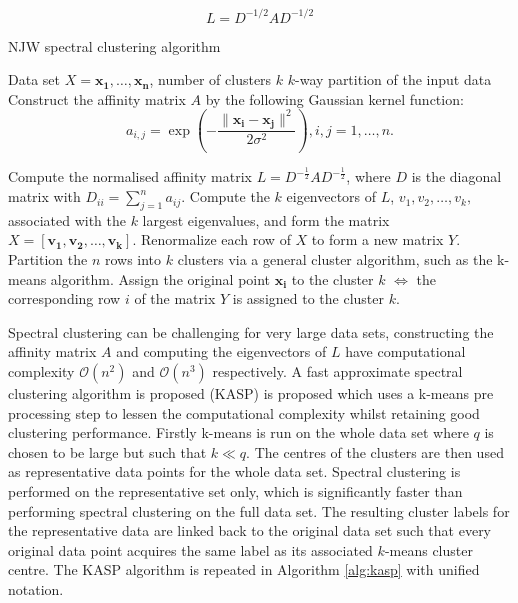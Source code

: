  \begin{equation}
   \label{eq:norm_laplacian}
   L=D^{-1/2}AD^{-1/2}
 \end{equation}


\begin{algorithm}
\caption{NJW spectral clustering algorithm}
\begin{algorithmic}[1]
\REQUIRE Data set $X = {\boldsymbol{x_1},\ldots, \boldsymbol{x_n}  }$, number of clusters $k$
\ENSURE $k$-way partition of the input data
\STATE Construct the affinity matrix $A$ by the following Gaussian kernel function:
\begin{equation*}
  a_{i,j} = \exp  \left( - \frac{\| \boldsymbol{x_i} - \boldsymbol{x_j} \|^2}{2 \sigma^2} \right), i,j = 1, \ldots,n.
\end{equation*}

\STATE Compute the normalised affinity matrix $L = D^{-\frac{1}{2}}A D^{-\frac{1}{2}}$, where $D$ is the diagonal matrix with $D_{ii}=\sum_{j=1}^{n} a_{ij}.$
\STATE Compute the $k$ eigenvectors of $L$, $v_1, v_2,\ldots , v_k,$ associated with the $k$ largest eigenvalues, and form the matrix $ X = [\boldsymbol{v_1},\boldsymbol{v_2}, \ldots , \boldsymbol{v_k}]$.
\STATE Renormalize each row of $X$ to form a new matrix $Y$.
\STATE Partition the $n$ rows into $k$ clusters via a general cluster algorithm, such as the k-means algorithm.
\STATE Assign the original point $\boldsymbol{x_i}$ to the cluster $k$ $\iff$ the corresponding row $i$ of the matrix $Y$ is assigned to the cluster $k$.

\end{algorithmic}
\label{alg:njw}
\end{algorithm}

Spectral clustering can be challenging for very large data sets, constructing the affinity matrix $A$ and computing the eigenvectors of $L$ have computational complexity $\mathcal{O}(n^2)$ and $\mathcal{O}(n^3)$ respectively. A fast approximate spectral clustering algorithm is proposed (KASP) is proposed \cite{Yan2009} which uses a k-means pre processing step to lessen the computational complexity whilst retaining good clustering performance. Firstly k-means is run on the whole data set where $q$ is chosen to be large but such that $k \ll q$. The centres of the clusters are then used as representative data points for the whole data set. Spectral clustering is performed on the representative set only, which is significantly faster than performing spectral clustering on the full data set. The resulting cluster labels for the representative data are linked back to the original data set such that every original data point acquires the same label as its associated $k$-means cluster centre. The KASP algorithm is repeated in Algorithm \ref{alg:kasp} with unified notation.

